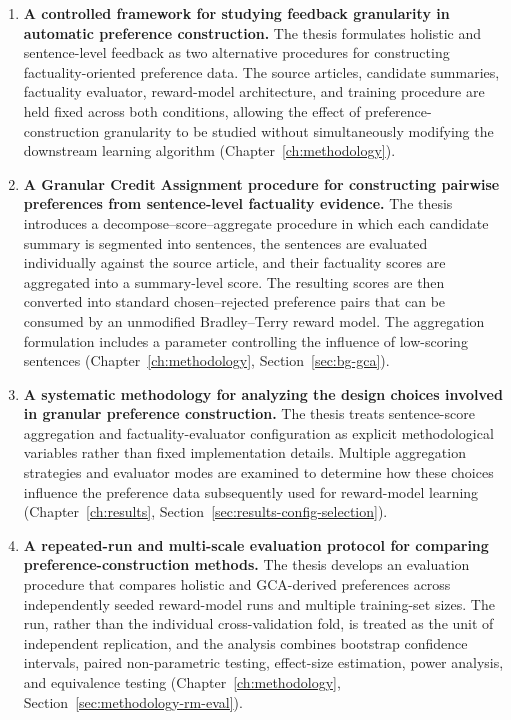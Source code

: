 \begin{enumerate}
  \item \textbf{A controlled framework for studying feedback granularity in
    automatic preference construction.} The thesis formulates holistic and
    sentence-level feedback as two alternative procedures for constructing
    factuality-oriented preference data. The source articles, candidate
    summaries, factuality evaluator, reward-model architecture, and training
    procedure are held fixed across both conditions, allowing the effect of
    preference-construction granularity to be studied without simultaneously
    modifying the downstream learning algorithm
    (Chapter~\ref{ch:methodology}).

  \item \textbf{A Granular Credit Assignment procedure for constructing
    pairwise preferences from sentence-level factuality evidence.} The thesis
    introduces a decompose--score--aggregate procedure in which each candidate
    summary is segmented into sentences, the sentences are evaluated
    individually against the source article, and their factuality scores are
    aggregated into a summary-level score. The resulting scores are then
    converted into standard chosen--rejected preference pairs that can be
    consumed by an unmodified Bradley--Terry reward model. The aggregation
    formulation includes a parameter controlling the influence of low-scoring
    sentences (Chapter~\ref{ch:methodology}, Section~\ref{sec:bg-gca}).

  \item \textbf{A systematic methodology for analyzing the design choices
    involved in granular preference construction.} The thesis treats
    sentence-score aggregation and factuality-evaluator configuration as
    explicit methodological variables rather than fixed implementation
    details. Multiple aggregation strategies and evaluator modes are examined
    to determine how these choices influence the preference data subsequently
    used for reward-model learning (Chapter~\ref{ch:results},
    Section~\ref{sec:results-config-selection}).

  \item \textbf{A repeated-run and multi-scale evaluation protocol for
    comparing preference-construction methods.} The thesis develops an
    evaluation procedure that compares holistic and GCA-derived preferences
    across independently seeded reward-model runs and multiple training-set
    sizes. The run, rather than the individual cross-validation fold, is
    treated as the unit of independent replication, and the analysis combines
    bootstrap confidence intervals, paired non-parametric testing,
    effect-size estimation, power analysis, and equivalence testing
    (Chapter~\ref{ch:methodology}, Section~\ref{sec:methodology-rm-eval}).


\end{enumerate}
